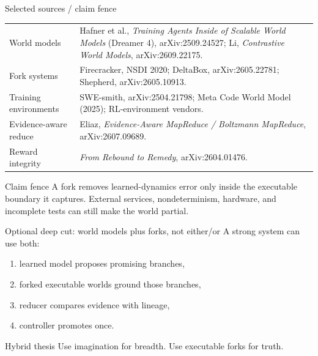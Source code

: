 \appendix
\begin{frame}{Selected sources / claim fence}
\footnotesize
\begin{tabular}{p{}p{}}
\toprule
World models & Hafner et al., \textit{Training Agents Inside of Scalable World Models} (Dreamer 4), arXiv:2509.24527; Li, \textit{Contrastive World Models}, arXiv:2609.22175. \\
Fork systems & Firecracker, NSDI 2020; DeltaBox, arXiv:2605.22781; Shepherd, arXiv:2605.10913. \\
Training environments & SWE-smith, arXiv:2504.21798; Meta Code World Model (2025); RL-environment vendors. \\
Evidence-aware reduce & Eliaz, \textit{Evidence-Aware MapReduce / Boltzmann MapReduce}, arXiv:2607.09689. \\
Reward integrity & \textit{From Rebound to Remedy}, arXiv:2604.01476. \\
\bottomrule
\end{tabular}
\vspace{0.65em}
\begin{block}{Claim fence}
A fork removes learned-dynamics error only inside the executable boundary it captures. External services, nondeterminism, hardware, and incomplete tests can still make the world partial.
\end{block}
\end{frame}

\begin{frame}{Optional deep cut: world models plus forks, not either/or}
\large
A strong system can use both:
\vspace{0.4em}
\begin{enumerate}
  \item learned model proposes promising branches,
  \item forked executable worlds ground those branches,
  \item reducer compares evidence with lineage,
  \item controller promotes once.
\end{enumerate}
\vspace{0.7em}
\begin{block}{Hybrid thesis}
Use imagination for breadth. Use executable forks for truth.
\end{block}
\end{frame}


